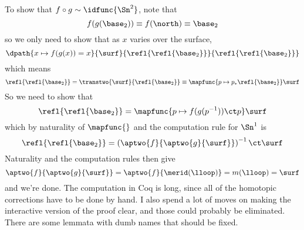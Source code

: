 To show that $f \circ g \sim \idfunc{\Sn^{2}}$, note that
\[
  f(g(\base_{2})) \equiv f(\north) \equiv \base_{2}
\]
so we only need to show that as $x$ varies over the surface,
\[
  \dpath{x \mapsto f(g(x)) =
  x}{\surf}{\refl{\refl{\base_{2}}}}{\refl{\refl{\base_{2}}}}
\]
which means
\[
 \refl{\refl{\base_{2}}} = \transtwo{\surf}{\refl{\base_{2}}}
  \equiv
  \mapfunc{p \mapsto p_{*} \refl{\base_{2}}}\surf
\]
So we need to show that
\[
  \refl{\refl{\base_{2}}} = \mapfunc{p \mapsto f(g(p^{-1})) \ct p} \surf
\]
which by naturality of $\mapfunc{}$ and the computation rule for $\Sn^{1}$ is
\[
  \refl{\refl{\base_{2}}} 
  =
  \left(\aptwo{f}{\aptwo{g}{\surf}}\right)^{-1}
  \ct
  \surf
\]
Naturality and the computation rules then give
\[
  \aptwo{f}{\aptwo{g}{\surf}} 
  = \aptwo{f}{\merid(\lloop)} 
  = m(\lloop)
  = \surf
\]
and we're done.  The computation in Coq is long, since all of the homotopic
corrections have to be done by hand.  I also spend a lot of moves on making the
interactive version of the proof clear, and those could probably be eliminated.
There are some lemmata with dumb names that should be fixed.
